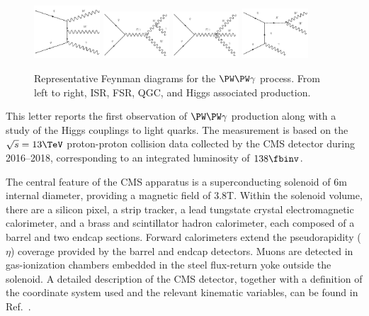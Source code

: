 \begin{figure}[htp]
    \centering
    \includegraphics[width=0.22\textwidth]{ISR.pdf}
    \includegraphics[width=0.22\textwidth]{FSR.pdf}
    \includegraphics[width=0.22\textwidth]{aQGC.pdf}
    \includegraphics[width=0.22\textwidth]{HG.pdf}
    \caption{Representative Feynman diagrams for the $\PW\PW\gamma$ process. From left to right, ISR, FSR, QGC, and Higgs associated production.}
    \label{fig:LO diagrams}
\end{figure}

This letter reports the first observation of $\PW\PW\gamma$ production along with a study of the Higgs couplings to light quarks. The measurement is based on the $\sqrt{s} = 13\TeV$ proton-proton collision data collected by the CMS detector during 2016--2018, corresponding to an integrated luminosity of $138\fbinv$.

The central feature of the CMS apparatus is a superconducting solenoid of 6\unit{m} internal diameter, providing a magnetic field of 3.8\unit{T}. Within the solenoid volume, there are a silicon pixel, a strip tracker, a lead tungstate crystal electromagnetic calorimeter, and a brass and scintillator hadron calorimeter, each composed of a barrel and two endcap sections. Forward calorimeters extend the pseudorapidity ($\eta$) coverage provided by the barrel and endcap detectors. Muons are detected in gas-ionization chambers embedded in the steel flux-return yoke outside the solenoid. A detailed description of the CMS detector, together with a definition of the coordinate system used and the relevant kinematic variables, can be found in Ref.~\cite{Chatrchyan:2008zzk}.

